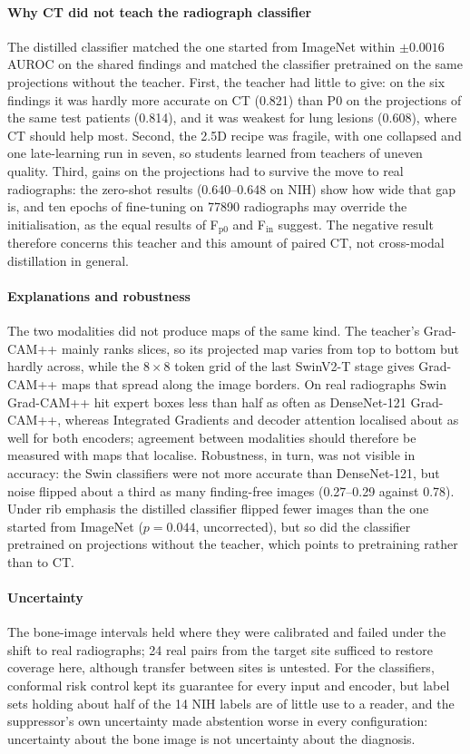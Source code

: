 \paragraph{Why CT did not teach the radiograph classifier} The distilled classifier matched the one started from ImageNet within
$\pm0.0016$ AUROC on the shared findings and matched the classifier pretrained on the same projections without the teacher. First, the
teacher had little to give: on the six findings it was hardly more accurate on CT (0.821) than P0 on the projections of the same test
patients (0.814), and it was weakest for lung lesions (0.608), where CT should help most. Second, the 2.5D recipe was fragile, with one
collapsed and one late-learning run in seven, so students learned from teachers of uneven quality. Third, gains on the projections had to
survive the move to real radiographs: the zero-shot results (0.640--0.648 on NIH) show how wide that gap is, and ten epochs of fine-tuning on
\num{77890} radiographs may override the initialisation, as the equal results of F$_\mathrm{p0}$ and F$_\mathrm{in}$ suggest. The negative
result therefore concerns this teacher and this amount of paired CT, not cross-modal distillation in general.

\paragraph{Explanations and robustness} The two modalities did not produce maps of the same kind. The teacher's Grad-CAM++ mainly ranks
slices, so its projected map varies from top to bottom but hardly across, while the $8\times8$ token grid of the last SwinV2-T stage gives
Grad-CAM++ maps that spread along the image borders. On real radiographs Swin Grad-CAM++ hit expert boxes less than half as often as
DenseNet-121 Grad-CAM++, whereas Integrated Gradients and decoder attention localised about as well for both encoders; agreement between
modalities should therefore be measured with maps that localise. Robustness, in turn, was not visible in accuracy: the Swin classifiers were
not more accurate than DenseNet-121, but noise flipped about a third as many finding-free images (0.27--0.29 against 0.78). Under rib
emphasis the distilled classifier flipped fewer images than the one started from ImageNet ($p=0.044$, uncorrected), but so did the
classifier pretrained on projections without the teacher, which points to pretraining rather than to CT.

\paragraph{Uncertainty} The bone-image intervals held where they were calibrated and failed under the shift to real radiographs; 24 real pairs
from the target site sufficed to restore coverage here, although transfer between sites is untested. For the classifiers, conformal risk
control kept its guarantee for every input and encoder, but label sets holding about half of the 14 NIH labels are of little use to a
reader, and the suppressor's own uncertainty made abstention worse in every configuration: uncertainty about the bone image is not
uncertainty about the diagnosis.

